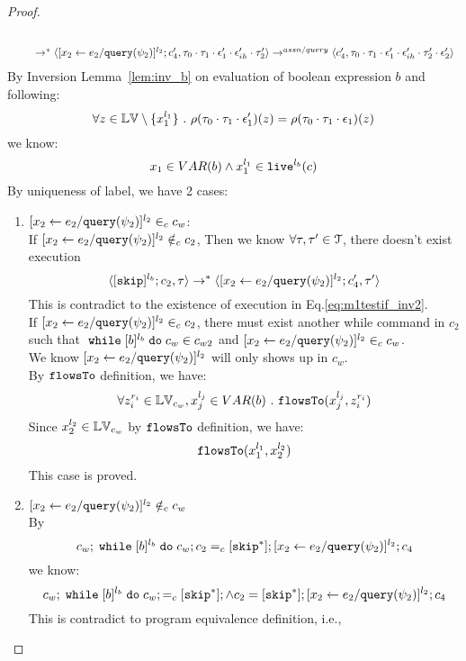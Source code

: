 \begin{proof}
\begin{case}
\begin{subcase}
\begin{subsubcase}
\begin{subproof}
\[\begin{array}{l}
  \\
  \qquad \rightarrow^{*} 
  \langle [\mathrel{ {x}_2 \leftarrow e_2 / {\tt query}(\psi_2) }]^{l_2};{c}_4', 
  \mathtt{\tau}_0 \cdot \mathtt{\tau}_1 \cdot \mathtt{\epsilon}_1' \cdot \mathtt{\epsilon}_{ih}' \cdot \mathtt{\tau}_2' \rangle
  \rightarrow^{assn/query} 
  \langle {c}_4',  \mathtt{\tau}_0 \cdot \mathtt{\tau}_1 \cdot \mathtt{\epsilon}_1' \cdot \mathtt{\epsilon}_{ih}' \cdot \mathtt{\tau}_2' \cdot \mathtt{\epsilon}_2' \rangle 
\end{array}
 \]
By Inversion Lemma~\ref{lem:inv_b} on evaluation of boolean expression $b$ and following: 
\[
  \forall z \in \mathbb{LV} \setminus \{x_1^{l_1}\} ~.~
  \rho(\mathtt{\tau}_0 \cdot \mathtt{\tau}_1 \cdot \mathtt{\epsilon}_1')(z) = \rho(\mathtt{\tau}_0 \cdot \mathtt{\tau}_1 \cdot \mathtt{\epsilon}_1)(z)
\]
we know:
\[
  x_1 \in VAR(b) \land x_1^{l_1} \in \mathtt{live}^{l_b}(c)
\]
%
 By uniqueness of label, we have 2 cases:
 \begin{enumerate}
 \item $[\mathrel{ {x}_2 \leftarrow e_2 / {\tt query}(\psi_2) }]^{l_2} \in_c c_w$:
 \\
 If $[\mathrel{ {x}_2 \leftarrow e_2 / {\tt query}(\psi_2) }]^{l_2} \notin_c c_2$,
 Then we know $\forall \mathtt{\tau}, \mathtt{\tau}' \in \mathcal{T}$, there doesn't exist execution
 \[
  \langle [\mathtt{skip}]^{l_b};c_2, \mathtt{\tau} \rangle \rightarrow^{*} 
  \langle [\mathrel{ {x}_2 \leftarrow e_2 / {\tt query}(\psi_2) }]^{l_2};{c}_4', \mathtt{\tau}' \rangle
 \]
 This is contradict to the existence of execution in Eq.\ref{eq:m1testif_inv2}.
 \\
  If $[\mathrel{ {x}_2 \leftarrow e_2 / {\tt query}(\psi_2) }]^{l_2} \in_c c_2$, there must exist another while command
   in $c_2$ such that 
  $\;\mathtt{while}\; [b]^{l_b} \;\mathtt{do}\; c_w \in c_{w2}$ and $[\mathrel{ {x}_2 \leftarrow e_2 / {\tt query}(\psi_2) }]^{l_2} \in_c c_w$.
  \\
  We know $[\mathrel{ {x}_2 \leftarrow e_2 / {\tt query}(\psi_2) }]^{l_2}$ will only shows up in $c_w$.
  \\
  By $\mathtt{flowsTo}$ definition, we have:
  \[
    \forall z_i^{r_i} \in \mathbb{LV}_{c_w}, x_j^{l_j} \in VAR(b) ~.~
    \mathtt{flowsTo}(x_j^{l_j}, z_i^{r_i})
  \]
  Since $x_2^{l_2} \in \mathbb{LV}_{c_w}$ by $\mathtt{flowsTo}$ definition, we have: 
  \[
    \mathtt{flowsTo}(x_1^{l_1}, x_2^{l_2})
  \]
  This case is proved.
 \item $[\mathrel{ {x}_2 \leftarrow e_2 / {\tt query}(\psi_2) }]^{l_2} \notin_c c_w$
 \\
 By
 \[
  c_w;\;\mathtt{while}\; [b]^{l_b} \;\mathtt{do}\; c_w; c_2 =_c [\mathtt{skip}^*]; [\mathrel{ {x}_2 \leftarrow e_2 / {\tt query}(\psi_2) }]^{l_2};{c}_4
\]
we know:
\[
  c_w;\;\mathtt{while}\; [b]^{l_b} \;\mathtt{do}\; c_w; =_c [\mathtt{skip}^*]; \land c_2 = [\mathtt{skip}^*]; [\mathrel{ {x}_2 \leftarrow e_2 / {\tt query}(\psi_2) }]^{l_2};{c}_4
\]
This is contradict to program equivalence definition, i.e.,

\end{enumerate}
\end{subproof}
\end{subsubcase}
\end{subcase}
\end{case}
\end{proof}
